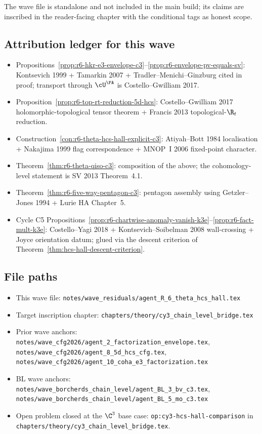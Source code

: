 The wave file is standalone and not included in the main build; its
claims are inscribed in the reader-facing chapter with the
conditional tags as honest scope.

\subsection*{Attribution ledger for this wave}

\begin{itemize}
\item Propositions~\ref{prop:r6-hkr-e3-envelope-c3}--\ref{prop:r6-envelope-pv-equals-sv}:
Kontsevich 1999 + Tamarkin 2007 + Tradler--Menichi--Ginzburg cited in
proof; transport through $\cU^\FA$ is Costello--Gwilliam 2017.
\item Proposition~\ref{prop:r6-top-rt-reduction-5d-hcs}:
Costello--Gwilliam 2017 holomorphic-topological tensor theorem +
Francis 2013 topological-$\R_t$ reduction.
\item Construction~\ref{con:r6-theta-hcs-hall-explicit-c3}: Atiyah--Bott
1984 localisation + Nakajima 1999 flag correspondence + MNOP~I 2006
fixed-point character.
\item Theorem~\ref{thm:r6-theta-qiso-c3}: composition of the above;
the cohomology-level statement is SV 2013 Theorem~4.1.
\item Theorem~\ref{thm:r6-five-way-pentagon-c3}: pentagon assembly
using Getzler--Jones 1994 + Lurie HA Chapter~5.
\item Cycle C5 Propositions~\ref{prop:r6-chartwise-anomaly-vanish-k3e}--\ref{prop:r6-fact-mult-k3e}:
Costello--Yagi 2018 + Kontsevich--Soibelman 2008 wall-crossing + Joyce
orientation datum; glued via the descent criterion of
Theorem~\ref{thm:hcs-hall-descent-criterion}.
\end{itemize}

\subsection*{File paths}

\begin{itemize}
\item This wave file:
\texttt{notes/wave\_residuals/agent\_R\_6\_theta\_hcs\_hall.tex}
\item Target inscription chapter:
\texttt{chapters/theory/cy3\_chain\_level\_bridge.tex}
\item Prior wave anchors:
\texttt{notes/wave\_cfg2026/agent\_2\_factorization\_envelope.tex},
\texttt{notes/wave\_cfg2026/agent\_8\_5d\_hcs\_cfg.tex},
\texttt{notes/wave\_cfg2026/agent\_10\_coha\_e3\_factorization.tex}
\item BL wave anchors:
\texttt{notes/wave\_borcherds\_chain\_level/agent\_BL\_3\_bv\_c3.tex},
\texttt{notes/wave\_borcherds\_chain\_level/agent\_BL\_5\_mo\_c3.tex}
\item Open problem closed at the $\C^3$ base case:
\texttt{op:cy3-hcs-hall-comparison} in
\texttt{chapters/theory/cy3\_chain\_level\_bridge.tex}.
\end{itemize}

